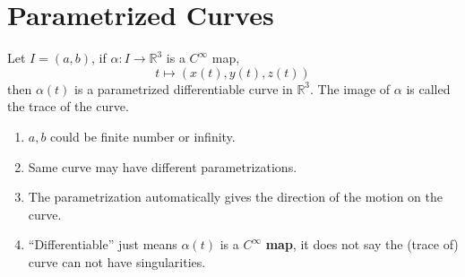 \section{Parametrized Curves}
\begin{defn}
    Let $I=(a,b)$, if $\alpha\colon I\to \mathbb{R}^3$ is a $C^\infty$ map,
    \[t \mapsto (x(t),y(t),z(t))\]
    then $\alpha(t)$ is a parametrized differentiable curve in $\mathbb{R}^3$. The image of $\alpha$ is called the trace of the curve. 
\end{defn}
\begin{remark}
    \hfill
    \begin{enumerate}[1)]
        \item $a,b$ could be finite number or infinity.
        \item Same curve may have different parametrizations.
        \item The parametrization automatically gives the direction of the motion on the curve.
        \item ``Differentiable'' just means $\alpha(t)$ is a $C^\infty$ \textbf{map}, it does not say the (trace of) curve can not have singularities.
    \end{enumerate}
\end{remark}
